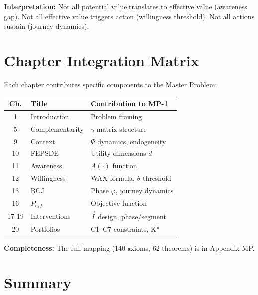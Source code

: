 \textbf{Interpretation:} Not all potential value translates to effective value (awareness gap). Not all effective value triggers action (willingness threshold). Not all actions sustain (journey dynamics).


\section{Chapter Integration Matrix}
\label{sec:25-integration}

Each chapter contributes specific components to the Master Problem:

\begin{tcolorbox}[colback=gray!5!white,colframe=gray!75!black,
    title=\textbf{Chapter Contribution Matrix (Selected)}]
\small
\begin{tabular}{|c|l|l|}
\hline
\textbf{Ch.} & \textbf{Title} & \textbf{Contribution to MP-1} \\
\hline
1 & Introduction & Problem framing \\
5 & Complementarity & $\gamma$ matrix structure \\
9 & Context & $\Psi$ dynamics, endogeneity \\
10 & FEPSDE & Utility dimensions $d$ \\
11 & Awareness & $A(\cdot)$ function \\
12 & Willingness & WAX formula, $\theta$ threshold \\
13 & BCJ & Phase $\varphi$, journey dynamics \\
16 & $P_{eff}$ & Objective function \\
17-19 & Interventions & $\vec{I}$ design, phase/segment \\
20 & Portfolios & C1--C7 constraints, K* \\
\hline
\end{tabular}
\end{tcolorbox}

\textbf{Completeness:} The full mapping (140 axioms, 62 theorems) is in Appendix MP.


\section{Summary}
\label{sec:25-summary}

